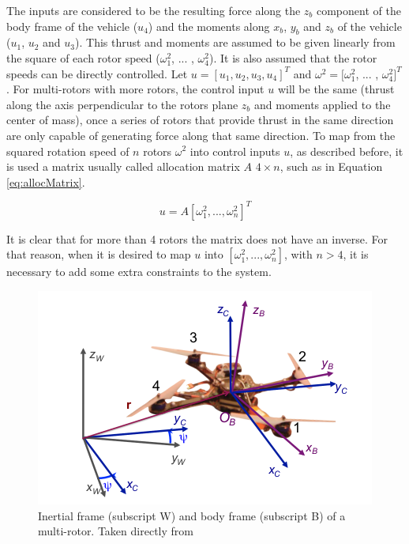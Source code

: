  The inputs are considered to be the resulting force along the $z_b$ component of the body frame of the vehicle ($u_4$) and the moments along $x_b$, $y_b$ and $z_b$ of the vehicle ($u_1$, $u_2$ and $u_3$). This thrust and moments are assumed to be given linearly from the square of each rotor speed ($\omega_1^2$, ... , $\omega_4^2$). It is also assumed that the rotor speeds can be directly controlled. Let $u=[u_1, u_2, u_3, u_4]^T$ and $\omega^2 = [\omega_1^2$, ... , $\omega_4^2]^T$. For multi-rotors with more rotors, the control input $u$ will be the same (thrust along the axis perpendicular to the rotors plane $z_b$ and moments applied to the center of mass), once a series of rotors that provide thrust in the same direction are only capable of generating force along that same direction. To map from the squared rotation speed of $n$ rotors $\omega^2$ into control inputs $u$, as described before, it is used a matrix usually called allocation matrix $A$ $4 \times n$, such as in Equation \ref{eq:allocMatrix}.
 
 \begin{equation}
     u=A [\omega_1^2, ... , \omega_n^2]^T
     \label{eq:allocMatrix}
 \end{equation}
 
 It is clear that for more than 4 rotors the matrix does not have an inverse. For that reason, when it is desired to map $u$ into $[\omega_1^2, ... , \omega_n^2]$, with $n>4$, it is necessary to add some extra constraints to the system.
 
 \begin{figure}[ht!]
     \centering
     \includegraphics[width=0.8\linewidth]{Figures/02_background/frames.png}
     \caption{Inertial frame (subscript W) and body frame (subscript B) of a multi-rotor. Taken directly from \cite{ref:mellingerFlat}}
     \label{fig:framesUAV}
 \end{figure}

